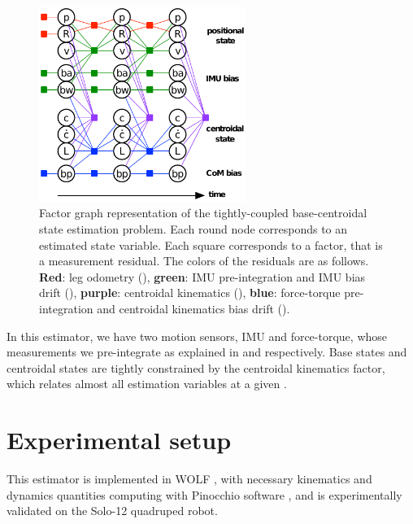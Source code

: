 \begin{figure}[t]
    \centering
    \includegraphics[width=0.6\textwidth]{figures/centroidal/centroidal_factor_graph.pdf}
    \caption{Factor graph representation of the tightly-coupled base-centroidal state estimation problem.
             Each round node corresponds to an estimated state variable. Each square corresponds to a factor, that is a measurement residual.
             The colors of the residuals are as follows. \textbf{Red}: leg odometry (), \textbf{green}: IMU pre-integration and IMU bias drift 
             (), \textbf{purple}: centroidal kinematics (), \textbf{blue}: force-torque pre-integration and
             centroidal kinematics bias drift ().
             }
    \label{fig:centroidal_factor_graph}
\end{figure}

In this estimator, we have two motion sensors, IMU and force-torque, whose measurements we pre-integrate as explained in  and
 respectively. Base states and centroidal states are tightly constrained by the centroidal kinematics factor, which relates almost all 
estimation variables at a given \keyframes.

\section{Experimental setup}

This estimator is implemented in WOLF \cite{sola2021wolf}, with necessary kinematics and dynamics quantities computing
with Pinocchio software \cite{carpentier2019pinocchio}, and is experimentally validated on the Solo-12 quadruped robot. 

